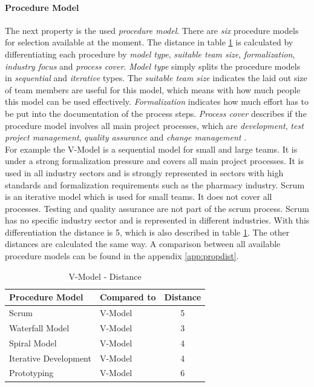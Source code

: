 \paragraph*{\textbf{Procedure Model}}
The next property is the used \textit{procedure model}. There are \textit{six} procedure models for selection available at the moment. The distance in table \ref{property:proceduremodel} is calculated by differentiating each procedure by \textit{model type}, \textit{suitable team size}, \textit{formalization}, \textit{industry focus} and \textit{process cover}. \textit{Model type} simply splits the procedure models in \textit{sequential} and \textit{iterative} types. The \textit{suitable team size} indicates the laid out size of team members are useful for this model, which means with how much people this model can be used effectively. \textit{Formalization} indicates how much effort has to be put into the documentation of the process steps. \textit{Process cover} describes if the procedure model involves all main project processes, which are \textit{development}, \textit{test project management}, \textit{quality assurance} and \textit{change management} \cite{incom}.\\
For example the V-Model is a sequential model for small and large teams. It is under a strong formalization pressure and covers all main project processes. It is used in all industry sectors and is strongly represented in sectors with high standards and formalization requirements such as the pharmacy industry. Scrum is an iterative model which is used for small teams. It does not cover all processes. Testing and quality assurance are not part of the scrum process. Scrum has no specific industry sector and is represented in different industries. With this differentiation the distance is 5, which is also described in table \ref{property:proceduremodel}. The other distances are calculated the same way. A comparison between all available procedure models can be found in the appendix \ref{app:propdist}.
\begin{table}[h]
	\centering 
	\setlength{\tabcolsep}{4pt}
	\begin{tabular}{|l|l|c|}\hline
		Procedure Model			& Compared to 	&  Distance 	\\ \hline
		Scrum   				& V-Model		& 5      		\\ \hline
		Waterfall Model   		& V-Model 		& 3      		\\ \hline
		Spiral Model   			& V-Model 		& 4     		\\ \hline
		Iterative Development   & V-Model 		& 4     		\\ \hline
		Prototyping  			& V-Model 		& 6     		\\ \hline
	\end{tabular} 
	\caption{V-Model - Distance} 
	\label{property:proceduremodel} 
\end{table}

